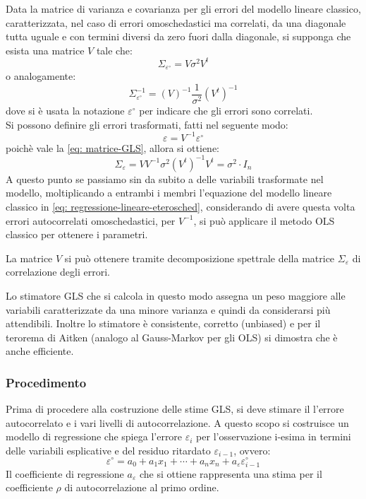 \documentclass[]{article}
\begin{document}
Data la matrice di varianza e covarianza per gli errori del modello lineare classico, caratterizzata, nel caso di errori omoschedastici ma correlati, da una diagonale tutta uguale e con termini diversi da zero fuori dalla diagonale, si supponga che esista una matrice $V$ tale che:
\begin{equation}
	\Sigma_{\varepsilon^\circ} = V \sigma^2 V^t
	\label{eq: matrice-GLS}
\end{equation}
o analogamente:
\begin{equation}
	\Sigma_{\varepsilon^\circ}^{-1} = (V)^{-1} \frac{1}{\sigma^2} (V^t)^{-1}
\end{equation}
dove si è usata la notazione $\varepsilon^\circ$ per indicare che gli errori sono correlati.\\
Si possono definire gli errori trasformati, fatti nel seguente modo:
\begin{equation}
	\varepsilon = V^{-1} \varepsilon^\circ
\end{equation}
poichè vale la \eqref{eq: matrice-GLS}, allora si ottiene:
\begin{equation}
\Sigma_\varepsilon = VV^{-1} \sigma^2 (V^t)^{-1}V^t = \sigma^2 \cdot I_n
\end{equation}
A questo punto se passiamo sin da subito a delle variabili trasformate nel modello, moltiplicando a entrambi i membri l'equazione del modello lineare classico in \eqref{eq: regressione-lineare-eterosched}, considerando di avere questa volta errori autocorrelati omoschedastici, per $V^{-1}$, si può applicare il metodo OLS classico per ottenere i parametri.

La matrice $V$ si può ottenere tramite decomposizione spettrale della matrice $\Sigma_\varepsilon$ di correlazione degli errori.

Lo stimatore GLS che si calcola in questo modo assegna un peso maggiore alle variabili caratterizzate da una minore varianza e quindi da considerarsi più attendibili. Inoltre lo stimatore è consistente, corretto (unbiased) e per il terorema di Aitken (analogo al Gauss-Markov per gli OLS) si dimostra che è anche efficiente.

\subsubsection{Procedimento}
Prima di procedere alla costruzione delle stime GLS,  si deve stimare il l'errore autocorrelato e i vari livelli di autocorrelazione. A questo scopo si costruisce un modello di regressione che spiega l'errore $\varepsilon_i$ per l'osservazione i-esima in termini delle variabili esplicative e del residuo ritardato $\varepsilon_{i-1}$, ovvero:
\begin{equation}
	\varepsilon^\circ = a_0 + a_1x_1 + \cdots + a_n x_n + a_\varepsilon \varepsilon_{i-1}^\circ
\end{equation}
Il coefficiente di regressione $a_\varepsilon$ che si ottiene rappresenta una stima per il coefficiente $\rho$ di autocorrelazione al primo ordine.
\end{document}
